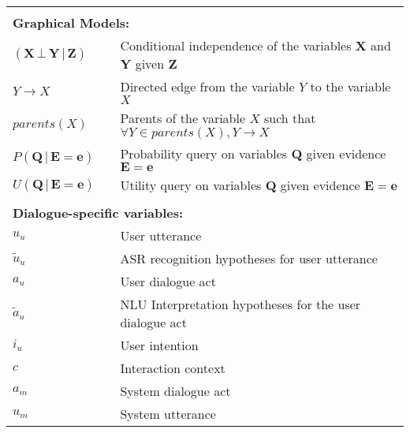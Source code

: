 \begin{longtable}{lp{5mm}p{11cm}}
&&  \vspace{3mm} \\
\multicolumn{3}{l}{\textbf{Graphical Models:}} \vspace{2mm} \\
$(\mathbf{X} \, \bot \, \mathbf{Y} \, | \, \mathbf{Z})$ && Conditional independence of the variables $\mathbf{X} $ and $\mathbf{Y}$ given $\mathbf{Z}$ \\
$Y \rightarrow X$ && Directed edge from the variable $Y$ to the variable $X$ \\
$parents(X)$ && Parents of the variable $X$ such that $\forall Y \in parents(X), Y \rightarrow X$ \\
 $P(\mathbf{Q}  \, | \,  \mathbf{E}\!=\!\mathbf{e})$ && Probability query on variables $\mathbf{Q}$ given evidence $\mathbf{E}\!=\!\mathbf{e}$ \\ 
 $U(\mathbf{Q}  \, | \,  \mathbf{E}\!=\!\mathbf{e})$ && Utility query on variables $\mathbf{Q}$ given evidence $\mathbf{E}\!=\!\mathbf{e}$ \\ 

&&  \vspace{3mm} \\
\multicolumn{3}{l}{\textbf{Dialogue-specific variables:}} \vspace{2mm} \\

$u_u$ && User utterance \\
$\tilde{u}_u$ && ASR recognition hypotheses for user utterance \\
$a_u$ && User dialogue act \\
$\tilde{a}_u$ && NLU Interpretation hypotheses for the user dialogue act \\
$i_u$ && User intention \\
$c$ && Interaction context \\
$a_m$ && System dialogue act \\
$u_m$ && System utterance \\

\end{longtable}

